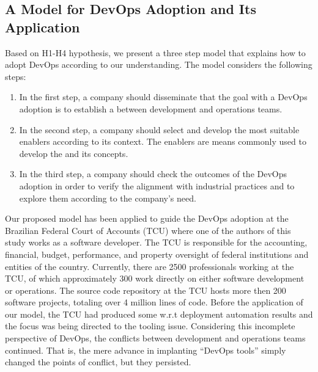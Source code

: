 \subsection{A Model for DevOps Adoption and Its Application}\label{sec:case_study}

Based on H1-H4 hypothesis, we present a three step model that
explains how to adopt DevOps according to our understanding. The
model considers the following steps:

\begin{enumerate}
\item In the first step, a company should
disseminate that the goal with a DevOps adoption is to
establish a \cc between
development and operations teams.

\item In the second step, a company should select and develop
the most suitable enablers according to its context. The enablers
are means commonly used to develop the \cc
and its concepts.

\item In the third step, a company should check the outcomes of the
DevOps adoption in order to verify the alignment with
industrial practices and to explore them according to the company's need.
\end{enumerate}

Our proposed model has been applied to guide the DevOps adoption at the Brazilian Federal Court of
Accounts (TCU) where one of the authors of this study works as a software
developer. The TCU is responsible for the accounting, financial, budget, performance, and property
oversight of federal institutions and entities of the country. Currently, there are 2500
professionals working at the TCU, of which approximately 300 work directly on either
software development or operations. The source code repository at the TCU hosts more then 200 software projects, totaling
over 4 million lines of code.
Before the application of our model, the TCU had produced some w.r.t deployment
automation results and the focus was being directed to the tooling issue. Considering this
incomplete perspective of DevOps, the conflicts between development and operations
teams continued. That is, the mere advance in implanting ``DevOps tools'' simply
changed the points of conflict, but they persisted.

